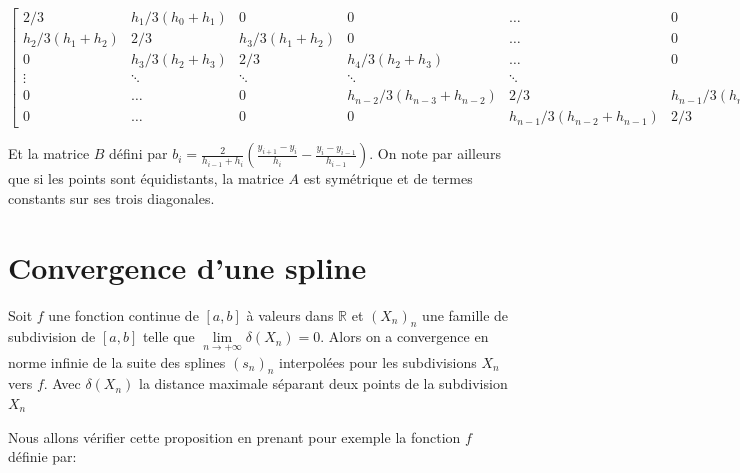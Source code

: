 \begingroup
\footnotesize
\[
\begin{bmatrix}
    2/3 & h_1/3(h_0+h_1) & 0 & 0 & \dots  & 0 \\
    h_2/3(h_1+h_2) & 2/3 & h_3/3(h_1+h_2) & 0 & \dots  & 0 \\
    0 &  h_3/3(h_2+h_3) & 2/3 & h_4/3(h_2+h_3) & \dots & 0 \\
    \vdots & \ddots & \ddots & \ddots & \ddots \\
    0 & \dots & 0 & h_{n-2}/3(h_{n-3}+h_{n-2}) & 2/3 & h_{n-1}/3(h_{n-3}+h_{n-2}) \\
    0 & \dots & 0 & 0 & h_{n-1}/3(h_{n-2}+h_{n-1}) & 2/3
\end{bmatrix}
\]
\endgroup

\vspace{0.5em}
Et la matrice $B$ défini par $b_i =  \frac{2}{h_{i-1}+h_{i}} (\frac{y_{i+1} - y_{i}}{h_{i}} - \frac{y_{i} - y_{i-1}}{h_{i-1}})$.
On note par ailleurs que si les points sont équidistants, la matrice $A$ est symétrique et de termes constants sur ses trois diagonales.

\section{Convergence d'une spline}
\begin{proposition}
Soit $f$ une fonction continue de $[a,b]$ à valeurs dans $\mathbb{R}$ et $(X_n)_n$ une famille de subdivision de $[a,b]$ telle que
$\lim\limits_{n \rightarrow +\infty} \delta(X_n) =  0$. Alors on a convergence en norme infinie de la suite des splines $(s_n)_n$ interpolées
pour les subdivisions $X_n$ vers $f$.
Avec $\delta(X_n)$ la distance maximale séparant deux points de la subdivision $X_n$
\end{proposition}

Nous allons vérifier cette proposition en prenant pour exemple la fonction $f$ définie par:

